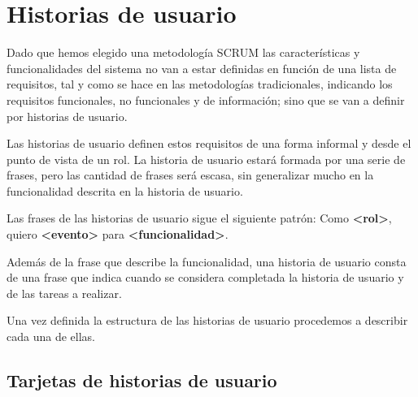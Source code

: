 \section{Historias de usuario}

Dado que hemos elegido una metodología SCRUM las características y funcionalidades del sistema no van a estar definidas en función de una lista de requisitos, tal y como se hace en las metodologías tradicionales, indicando los requisitos funcionales, no funcionales y de información; sino que se van a definir por historias de usuario.

Las historias de usuario definen estos requisitos de una forma informal y desde el punto de vista de un rol. La historia de usuario estará formada por una serie de frases, pero las cantidad de frases será escasa, sin generalizar mucho en la funcionalidad descrita en la historia de usuario.

Las frases de las historias de usuario sigue el siguiente patrón: Como \textbf{<rol>}, quiero \textbf{<evento>} para \textbf{<funcionalidad>}.

Además de la frase que describe la funcionalidad, una historia de usuario consta de una frase que indica cuando se considera completada la historia de usuario y de las tareas a realizar.

Una vez definida la estructura de las historias de usuario procedemos a describir cada una de ellas.


\subsection{Tarjetas de historias de usuario}


